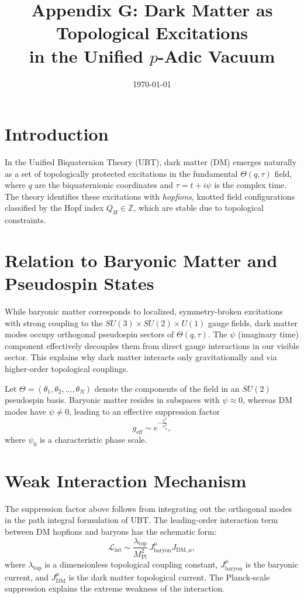 \documentclass[12pt,a4paper]{article}
\title{Appendix G: Dark Matter as Topological Excitations\\in the Unified $p$-Adic Vacuum}
\author{}
\date{\today}
\begin{document}
\maketitle

\section{Introduction}
In the Unified Biquaternion Theory (UBT), dark matter (DM) emerges naturally as a set of topologically protected excitations in the fundamental $\Theta(q,\tau)$ field, where $q$ are the biquaternionic coordinates and $\tau = t + i\psi$ is the complex time. The theory identifies these excitations with \emph{hopfions}, knotted field configurations classified by the Hopf index $Q_H \in \mathbb{Z}$, which are stable due to topological constraints.

\section{Relation to Baryonic Matter and Pseudospin States}
While baryonic matter corresponds to localized, symmetry-broken excitations with strong coupling to the $SU(3) \times SU(2) \times U(1)$ gauge fields, dark matter modes occupy orthogonal pseudospin sectors of $\Theta(q,\tau)$.
The $\psi$ (imaginary time) component effectively decouples them from direct gauge interactions in our visible sector. This explains why dark matter interacts only gravitationally and via higher-order topological couplings.

Let $\Theta = (\theta_1, \theta_2, ..., \theta_N)$ denote the components of the field in an $SU(2)$ pseudospin basis. Baryonic matter resides in subspaces with $\psi \approx 0$, whereas DM modes have $\psi \neq 0$, leading to an effective suppression factor
\begin{equation}
g_{\mathrm{eff}} \sim e^{-\frac{\psi^2}{\psi_0^2}},
\end{equation}
where $\psi_0$ is a characteristic phase scale.

\section{Weak Interaction Mechanism}
The suppression factor above follows from integrating out the orthogonal modes in the path integral formulation of UBT. The leading-order interaction term between DM hopfions and baryons has the schematic form:
\begin{equation}
\mathcal{L}_{\mathrm{int}} \sim \frac{\lambda_{\mathrm{top}}}{M_{\mathrm{Pl}}^2} \, J_{\mathrm{baryon}}^\mu J_{\mathrm{DM},\mu},
\end{equation}
where $\lambda_{\mathrm{top}}$ is a dimensionless topological coupling constant, $J_{\mathrm{baryon}}^\mu$ is the baryonic current, and $J_{\mathrm{DM}}^\mu$ is the dark matter topological current. The Planck-scale suppression explains the extreme weakness of the interaction.
\end{document}
